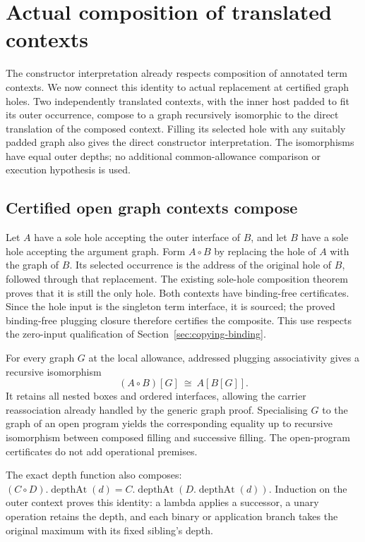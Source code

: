 \clearpage
\section{Actual composition of translated contexts}
\label{sec:copying-translated-composition}
The constructor interpretation already respects composition of annotated term
contexts. We now connect this identity to actual replacement at certified graph
holes. Two independently translated contexts, with the inner host padded to
fit its outer occurrence, compose to a graph recursively isomorphic to the
direct translation of the composed context. Filling its selected hole with
any suitably padded graph also gives the direct constructor interpretation.
The isomorphisms have equal outer depths; no additional common-allowance
comparison or execution hypothesis is used.

\subsection{Certified open graph contexts compose}
Let $A$ have a sole hole accepting the outer interface of $B$, and let $B$
have a sole hole accepting the argument graph. Form $A\circ B$ by replacing
the hole of $A$ with the graph of $B$. Its selected occurrence is the address
of the original hole of $B$, followed through that replacement. The existing
sole-hole composition theorem proves that it is still the only hole.
Both contexts have binding-free certificates. Since the hole input is the
singleton term interface, it is sourced; the proved binding-free plugging
closure therefore certifies the composite. This use respects the zero-input
qualification of Section~\ref{sec:copying-binding}.

For every graph $G$ at the local allowance, addressed plugging associativity
gives a recursive isomorphism
\[
  (A\circ B)[G]\ \cong\ A[B[G]].
\]
It retains all nested boxes and ordered interfaces, allowing the carrier
reassociation already handled by the generic graph proof. Specialising $G$
to the graph of an open program yields the corresponding equality up to
recursive isomorphism between composed filling and successive filling.
The open-program certificates do not add operational premises.

The exact depth function also composes:
$(C\circ D).\operatorname{depthAt}(d)
=C.\operatorname{depthAt}(D.\operatorname{depthAt}(d))$.
Induction on the outer context proves this identity: a lambda applies a
successor, a unary operation retains the depth, and each binary or application
branch takes the original maximum with its fixed sibling's depth.

